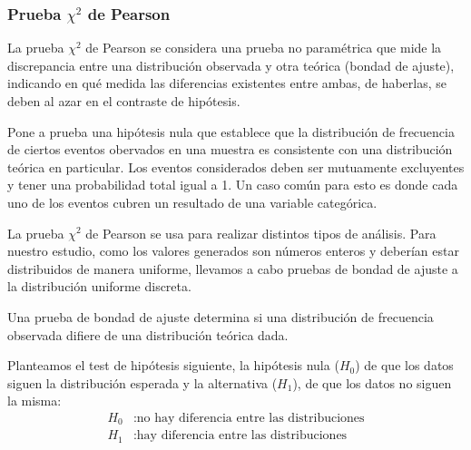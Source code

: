 \subsubsection{Prueba \texorpdfstring{$\chi^2$}{X2} de Pearson}
La prueba $\chi^2$ de Pearson se considera una prueba no paramétrica que mide la discrepancia entre una distribución observada y otra teórica (bondad de ajuste), indicando en qué medida las diferencias existentes entre ambas, de haberlas, se deben al azar en el contraste de hipótesis.\cite{eswiki2022pearson}

Pone a prueba una hipótesis nula que establece que la distribución de frecuencia de ciertos eventos obervados en una muestra es consistente con una distribución teórica en particular. Los eventos considerados deben ser mutuamente excluyentes y tener una probabilidad total igual a 1. Un caso común para esto es donde cada uno de los eventos cubren un resultado de una variable categórica.

La prueba $\chi^{2}$ de Pearson se usa para realizar distintos tipos de análisis. Para nuestro estudio, como los valores generados son números enteros y deberían estar distribuidos de manera uniforme, llevamos a cabo pruebas de bondad de ajuste a la distribución uniforme discreta.

Una prueba de bondad de ajuste determina si una distribución de frecuencia observada difiere de una distribución teórica dada.

Planteamos el test de hipótesis siguiente, la hipótesis nula ($H_{0}$) de que los datos siguen la distribución esperada y la alternativa ($H_{1}$), de que los datos no siguen la misma:
\begin{align*}
H_{0}&: \text{no hay diferencia entre las distribuciones}\\
H_{1}&: \text{hay diferencia entre las distribuciones}
\end{align*}

